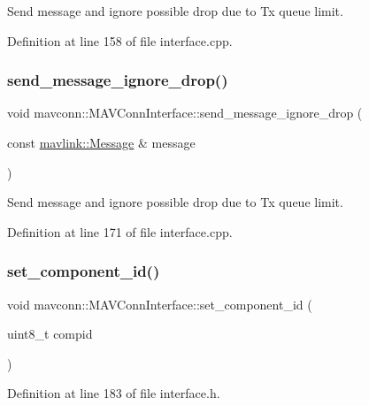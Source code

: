 Send message and ignore possible drop due to Tx queue limit. 



Definition at line 158 of file interface.\+cpp.

\mbox{\label{group__mavconn_gaafdea305c3cd449ac629f84598febbe0}} 
\subsubsection{\texorpdfstring{send\_message\_ignore\_drop()}{send\_message\_ignore\_drop()}\hspace{0.1cm}{\footnotesize\ttfamily [2/2]}}
{\footnotesize\ttfamily void mavconn\+::\+M\+A\+V\+Conn\+Interface\+::send\+\_\+message\+\_\+ignore\+\_\+drop (\begin{DoxyParamCaption}\item[{const \mbox{\hyperlink{structmavlink_1_1Message}{mavlink\+::\+Message}} \&}]{message }\end{DoxyParamCaption})}



Send message and ignore possible drop due to Tx queue limit. 



Definition at line 171 of file interface.\+cpp.

\mbox{\label{group__mavconn_gac3e7c34cdb6e8104959654ff49bd2497}} 
\subsubsection{\texorpdfstring{set\_component\_id()}{set\_component\_id()}}
{\footnotesize\ttfamily void mavconn\+::\+M\+A\+V\+Conn\+Interface\+::set\+\_\+component\+\_\+id (\begin{DoxyParamCaption}\item[{uint8\+\_\+t}]{compid }\end{DoxyParamCaption})\hspace{0.3cm}{\ttfamily [inline]}}



Definition at line 183 of file interface.\+h.

\mbox{\label{group__mavconn_gae78b30f23f5f1a94684761f7ddc0d2e2}} 

